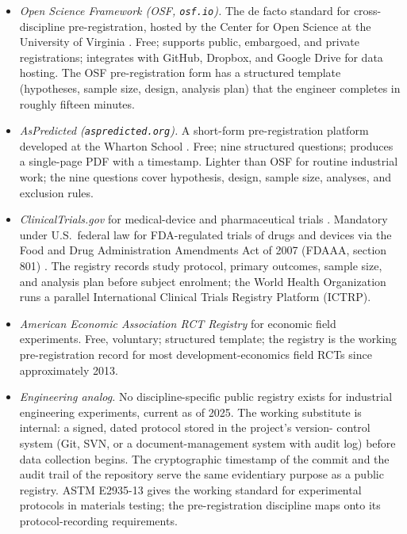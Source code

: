 \begin{itemize}[leftmargin=*]
  \item \textit{Open Science Framework (OSF, \texttt{osf.io}).}
    The de facto standard for cross-discipline pre-registration,
    hosted by the Center for Open Science at the University of
    Virginia \cite{web:ch08t3b-osf-2025}. Free; supports
    public, embargoed, and private registrations; integrates with
    GitHub, Dropbox, and Google Drive for data hosting. The OSF
    pre-registration form has a structured template (hypotheses,
    sample size, design, analysis plan) that the engineer
    completes in roughly fifteen minutes.
  \item \textit{AsPredicted (\texttt{aspredicted.org}).} A
    short-form pre-registration platform developed at the Wharton
    School \cite{web:ch08t3b-aspredicted-2025}. Free; nine
    structured questions; produces a single-page PDF with a
    timestamp. Lighter than OSF for routine industrial work; the
    nine questions cover hypothesis, design, sample size,
    analyses, and exclusion rules.
  \item \textit{ClinicalTrials.gov} for medical-device and
    pharmaceutical trials \cite{web:ch08t3b-clinicaltrials-gov-2025}.
    Mandatory under U.S.\ federal law for FDA-regulated trials of
    drugs and devices via the Food and Drug Administration
    Amendments Act of 2007 (FDAAA, section 801)
    \cite{law:ch08t3b-fdaaa-2007}. The registry records study
    protocol, primary outcomes, sample size, and analysis plan
    before subject enrolment; the World Health Organization runs
    a parallel International Clinical Trials Registry Platform
    (ICTRP).
  \item \textit{American Economic Association RCT Registry}
    \cite{web:ch08t3b-aea-rct-registry-2025} for economic field
    experiments. Free, voluntary; structured template; the
    registry is the working pre-registration record for most
    development-economics field RCTs since approximately 2013.
  \item \textit{Engineering analog.} No discipline-specific
    public registry exists for industrial engineering experiments,
    current as of 2025. The working substitute is internal:
    a signed, dated protocol stored in the project's version-
    control system (Git, SVN, or a document-management system
    with audit log) before data collection begins. The cryptographic
    timestamp of the commit and the audit trail of the repository
    serve the same evidentiary purpose as a public registry. ASTM
    E2935-13 \cite{std:ch08t3b-astm-e2935-2013} gives the working
    standard for experimental protocols in materials testing; the
    pre-registration discipline maps onto its protocol-recording
    requirements.
\end{itemize}

